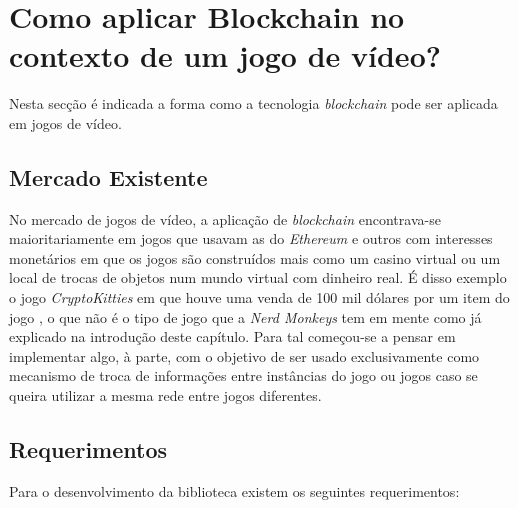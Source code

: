 \newpage
\section{Como aplicar Blockchain no contexto de um jogo de vídeo?}
\label{sec:blockchain_how}

Nesta secção é indicada a forma como a tecnologia \textit{blockchain} pode ser aplicada em jogos de vídeo.

\subsection{Mercado Existente}

No mercado de jogos de vídeo, a aplicação de \textit{blockchain}
encontrava-se maioritariamente em jogos que usavam as  do \textit{Ethereum}  e outros com interesses monetários \cite{list_of_blockchain_games} em que os jogos são construídos mais como um casino virtual ou um local de trocas de objetos num mundo virtual com dinheiro real. É disso exemplo o jogo \textit{CryptoKitties} em que houve uma venda de 100 mil dólares por um item do jogo \cite{cryptokitties}, o que não é o tipo de jogo que a \textit{Nerd Monkeys} tem em mente como já explicado na introdução deste capítulo. Para tal começou-se a pensar em implementar algo, à parte, com o objetivo de ser usado exclusivamente como mecanismo de troca de informações entre instâncias do jogo ou jogos caso se queira utilizar a mesma rede entre jogos diferentes.

\subsection{Requerimentos}

Para o desenvolvimento da biblioteca \gamechaining{} existem os seguintes requerimentos:

